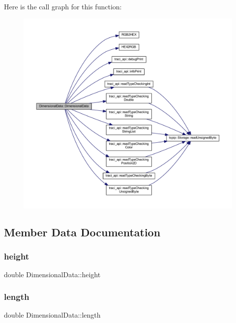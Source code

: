 Here is the call graph for this function\+:
\nopagebreak
\begin{figure}[H]
\begin{center}
\leavevmode
\includegraphics[width=350pt]{class_dimensional_data_a85c1d983a7dbe67ed9d93336e37b2b74_cgraph}
\end{center}
\end{figure}


\subsection{Member Data Documentation}
\mbox{\label{class_dimensional_data_ad5deedd58ab9d79954d33780f0e2fce2}} 
\subsubsection{\texorpdfstring{height}{height}}
{\footnotesize\ttfamily double Dimensional\+Data\+::height}

\mbox{\label{class_dimensional_data_a07f712bbdabdc7cadc671feb480065a4}} 
\subsubsection{\texorpdfstring{length}{length}}
{\footnotesize\ttfamily double Dimensional\+Data\+::length}

